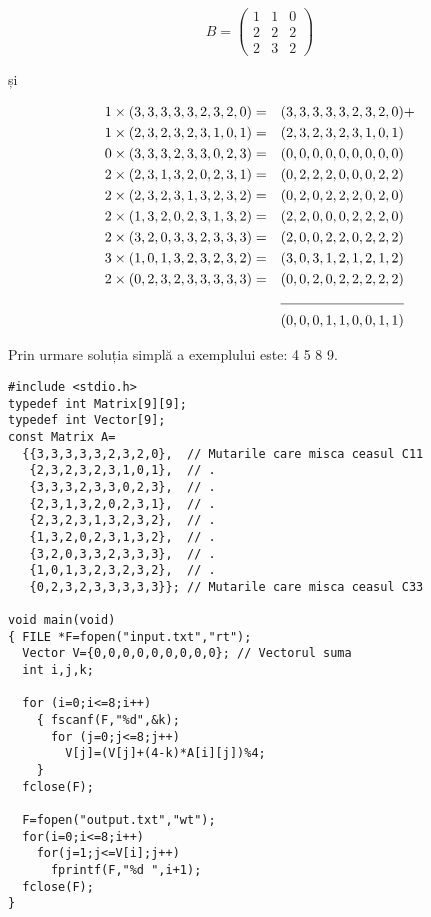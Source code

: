 \begin{equation}
  B =
  \begin{pmatrix}
    1 & 1 & 0 \\
    2 & 2 & 2 \\
    2 & 3 & 2
  \end{pmatrix}
\end{equation}

și

\begin{align*}
1 & \times (3,3,3,3,3,2,3,2,0) = & (3,3,3,3,3,2,3,2,0) & + \\
1 & \times (2,3,2,3,2,3,1,0,1) = & (2,3,2,3,2,3,1,0,1) & \\
0 & \times (3,3,3,2,3,3,0,2,3) = & (0,0,0,0,0,0,0,0,0) & \\
2 & \times (2,3,1,3,2,0,2,3,1) = & (0,2,2,2,0,0,0,2,2) & \\
2 & \times (2,3,2,3,1,3,2,3,2) = & (0,2,0,2,2,2,0,2,0) & \\
2 & \times (1,3,2,0,2,3,1,3,2) = & (2,2,0,0,0,2,2,2,0) & \\
2 & \times (3,2,0,3,3,2,3,3,3) = & (2,0,0,2,2,0,2,2,2) & \\
3 & \times (1,0,1,3,2,3,2,3,2) = & (3,0,3,1,2,1,2,1,2) & \\
2 & \times (0,2,3,2,3,3,3,3,3) = & (0,0,2,0,2,2,2,2,2) & \\
\cline{3-3}
  &                              & (0,0,0,1,1,0,0,1,1) &
\end{align*}

Prin urmare soluția simplă a exemplului este: 4 5 8 9.

\begin{verbatim}
#include <stdio.h>
typedef int Matrix[9][9];
typedef int Vector[9];
const Matrix A=
  {{3,3,3,3,3,2,3,2,0},  // Mutarile care misca ceasul C11
   {2,3,2,3,2,3,1,0,1},  // .
   {3,3,3,2,3,3,0,2,3},  // .
   {2,3,1,3,2,0,2,3,1},  // .
   {2,3,2,3,1,3,2,3,2},  // .
   {1,3,2,0,2,3,1,3,2},  // .
   {3,2,0,3,3,2,3,3,3},  // .
   {1,0,1,3,2,3,2,3,2},  // .
   {0,2,3,2,3,3,3,3,3}}; // Mutarile care misca ceasul C33

void main(void)
{ FILE *F=fopen("input.txt","rt");
  Vector V={0,0,0,0,0,0,0,0,0}; // Vectorul suma
  int i,j,k;

  for (i=0;i<=8;i++)
    { fscanf(F,"%d",&k);
      for (j=0;j<=8;j++)
        V[j]=(V[j]+(4-k)*A[i][j])%4;
    }
  fclose(F);

  F=fopen("output.txt","wt");
  for(i=0;i<=8;i++)
    for(j=1;j<=V[i];j++)
      fprintf(F,"%d ",i+1);
  fclose(F);
}
\end{verbatim}
